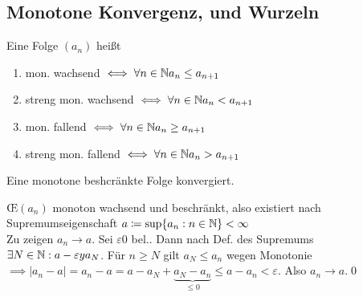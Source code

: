 \subsection{Monotone Konvergenz,  und Wurzeln}
\begin{subdefinition}
	Eine Folge $(a_n)$ heißt
	\begin{enumerate}[label=(\roman*)]
		\item mon. wachsend $\iff \forall n \in \mathbb{N} a_n \leq a_{n+1} $
		\item streng mon. wachsend $\iff \forall n \in \mathbb{N} a_n < a_{n+1} $
		\item mon. fallend  $\iff \forall n \in \mathbb{N} a_n \geq a_{n+1} $
		\item streng mon. fallend $\iff \forall n \in \mathbb{N} a_n > a_{n+1} $
	\end{enumerate}
\end{subdefinition}
\begin{subtheorem}
	Eine monotone beshcränkte Folge konvergiert.
	\begin{subproof*}
		\OE $(a_n)$ monoton wachsend und beschränkt, also existiert nach Supremumseigenschaft $ a \coloneqq \sup\{a_n : n \in \mathbb{N} \} < \infty $\\
		Zu zeigen $ a_n \to a $. Sei $ \varepsilon 0 $ bel.. Dann nach Def. des Supremums $ \exists N \in \mathbb{N} : a - \varepsilon y a_N $. Für $ n \geq N $ gilt $ a_N \leq a_n $ wegen Monotonie $ \implies | a_n - a | = a_n - a = a - a_N + \underbrace{a_N - a_n}_{\leq 0} \leq a - a_n < \varepsilon $. Also $ a_n \to a $.\qed
	\end{subproof*}
\end{subtheorem}

